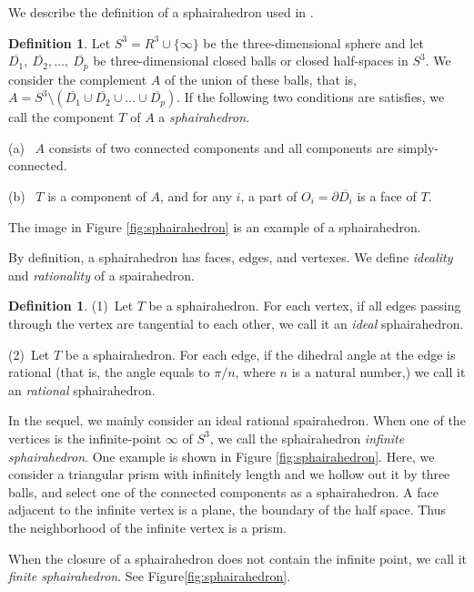 \documentclass[suppldata, dvipdfmx]{interact}
\theoremstyle{plain}%
\theoremstyle{definition}
\newtheorem{definition}[theorem]{Definition}
\theoremstyle{remark}
\theoremstyle{problemstyle}
\begin{document}
We describe the definition of a sphairahedron used in \cite{bridges2018}.
\begin{definition}
Let $S^3 = R^3 \cup \{\infty\}$ be the three-dimensional sphere and let
$\overline{D_1},~\overline{D_2},\ldots,~\overline{D_p}$ be
three-dimensional closed balls or closed half-spaces in $S^3$.
We consider the complement $A$ of the union of these balls, that is,
$A = S^3 \setminus (\overline{D_1} \cup \overline{D_2} \cup ... \cup \overline{D_p})$.
If the following two conditions are satisfies, we call the component $T$ of $A$ a {\it sphairahedron.} \par
(a) \ $A$ consists of two connected components and all components are simply-connected.\par
(b) \ $T$ is a component of $A$, and for any $i$, a part of $O_i=\partial\overline{D_i}$ is a face of $T$.
\end{definition}
The image in Figure \ref{fig:sphairahedron}
is an example of a sphairahedron. 

By definition, a sphairahedron has faces, edges, and
vertexes. We define \emph{ideality} and \emph{rationality} of a spairahedron.

\begin{definition}
(1)\ Let $T$ be a sphairahedron.  For each vertex, if all edges passing through the vertex are tangential to each other, we call it an \emph{ideal} sphairahedron.\par 
(2)\ Let $T$ be a sphairahedron.  For each edge, if the dihedral angle at the edge is rational (that is, the angle equals to $\pi/n$, where $n$ is a natural number,) we call it an \emph{rational} sphairahedron.
\end{definition}

In the sequel, we mainly consider an ideal rational spairahedron.  
When one of the vertices is the infinite-point $\infty$ of $S^3$,
we call the sphairahedron \textit{infinite sphairahedron}.
One example is shown in Figure
\ref{fig:sphairahedron}.
Here, we consider a triangular prism with infinitely length and we hollow
out it by three balls, and select one of the connected components as a  sphairahedron.  A face adjacent to the infinite vertex is a plane, the boundary of the half space.  Thus the neighborhood of the infinite vertex is a prism.

When the closure of a sphairahedron does not contain the infinite point,
we call it \textit{finite sphairahedron}.
See Figure\ref{fig:sphairahedron}.
\end{document}
